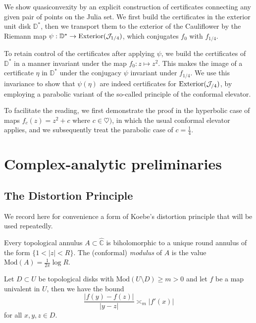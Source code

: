 We show quasiconvexity by an explicit construction of certificates connecting any given pair of points on the Julia set.
We first build the certificates in the exterior unit disk $\mathbb D ^*$, 
then we transport them to the exterior of the Cauliflower by the Riemann map $\psi: \mathbb D ^* \to \operatorname{Exterior}(\mathcal J_{1 / 4})$, 
which conjugates $f_0$ with $f_{1/4}$.

To retain control of the certificates after applying $\psi$, we build the certificates of $\mathbb D^*$ in a manner invariant under the map $f_0: z\mapsto z^2$.
This makes the image of a certificate $\eta$ in $\mathbb D^{*}$ under the conjugacy $\psi$ invariant under $f_{1/4}$. 
We use this invariance to show that $\psi(\eta)$ are indeed certificates for $\operatorname{Exterior}(\mathcal J_{/4})$, 
by employing a parabolic variant of the so-called principle of the conformal elevator.

To facilitate the reading, we first demonstrate the proof in the hyperbolic case of maps $f_c(z)=z^2+c$ where 
$c\in \heartsuit)$, in which the usual conformal elevator applies, 
and we subsequently treat the parabolic case of $c=\frac{1}{4}$.

\section{Complex-analytic preliminaries}

\subsection{The Distortion Principle}
We record here for convenience a form of Koebe's distortion principle that will be used repeatedly. 

\begin{definition}
	Every topological annulus $A \subset \hat{\mathbb C}$ is biholomorphic to 
	a unique round annulus of the form $\{ 1<|z|<R \}$. 
	The (conformal) \emph{modulus} of $A$ is the value $\mathrm {Mod}(A) = \frac 1{2\pi} \log R$.
\end{definition}
\begin{theorem}  \label{Koebe}
	Let $D \subset U $ be topological disks with $\mathrm {Mod}(U \setminus D)  \geq m>0$
	 and let $f$ be a map univalent in $U$,
	then we have the bound 
	\begin{equation}
		\frac {|f(y)-f(z)|}{|y-z|} \asymp_m |f'(x)|
	\end{equation}
	for all $x,y,z \in D$.
\end{theorem}

